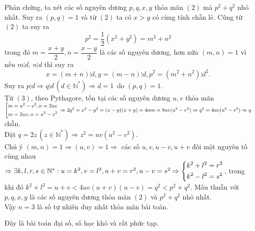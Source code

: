 \begin{bt}
{		Phản chứng, ta xét các số nguyên dương $p,q,x,y$ thỏa mãn $(2)$ mà $p^2+q^2$ nhỏ nhất. Suy ra $(p,q)=1$ và từ $(2)$ ta có $x>y$ có cùng tính chẵn lẻ.
		Cũng từ $(2)$ ta suy ra \[p^2=\dfrac{1}{2}\left(x^2+y^2\right)=m^2+n^2 \tag{3}\] trong đó $m=\dfrac{x+y}{2}, n=\dfrac{x-y}{2}$ là các số nguyên dương, hơn nữa $(m,n)=1$ vì nếu $m \vdots d$, $n \vdots d$ thì suy ra 
		$$x=(m+n) \vdots d, y=(m-n) \vdots d,p^2=(m^2+n^2) \vdots d^2.$$
		Suy ra $ p \vdots d\Rightarrow q \vdots d \, (d\in\mathbb{N^*})\Rightarrow d=1\,$ do $(p,q)=1$.\\
		Từ $(3)$, theo Pythagore, tồn tại các số nguyên dương $u,v$ thỏa mãn $\left[\begin{aligned}&m=u^2-v^2, n=2uv\\&m=2uv, n=u^2-v^2\end{aligned}\right.\\ \Rightarrow 2q^2=x^2-y^2=(x-y)(x+y)=4mn=8uv(u^2-v^2) \Rightarrow q^2=4uv(u^2-v^2)\Rightarrow q$ chẵn.\\ Đặt $q=2z \, (z\in\mathbb{N^*})\Rightarrow z^2=uv(u^2-v^2)$.\\ Chú ý $(m,n)=1\Rightarrow (u,v)=1\Rightarrow$ các số $u,v,u-v,u+v$ đôi một nguyên tố cùng nhau \\$\Rightarrow \exists k,l,r,s \in \mathbb{N^*}:u=k^2, v=l^2, u+v=r^2, u-v=s^2 \Rightarrow \left\{\begin{aligned}&k^2+l^2=r^2\\&k^2-l^2=s^2\end{aligned}\right.$, trong khi đó $k^2+l^2=u+v<4uv(u+v)(u-v)=q^2<p^2+q^2$. Mâu thuẫn với $p,q,x,y$ là các số nguyên dương thỏa mãn $(2)$ và $p^2+q^2$ nhỏ nhất.\\ Vậy $n=3$ là số tự nhiên duy nhất thỏa mãn bài toán.
		\begin{nx}
			Đây là bài toán đại số, số học khó và rất phức tạp.
		\end{nx}
		
	}
\end{bt}



